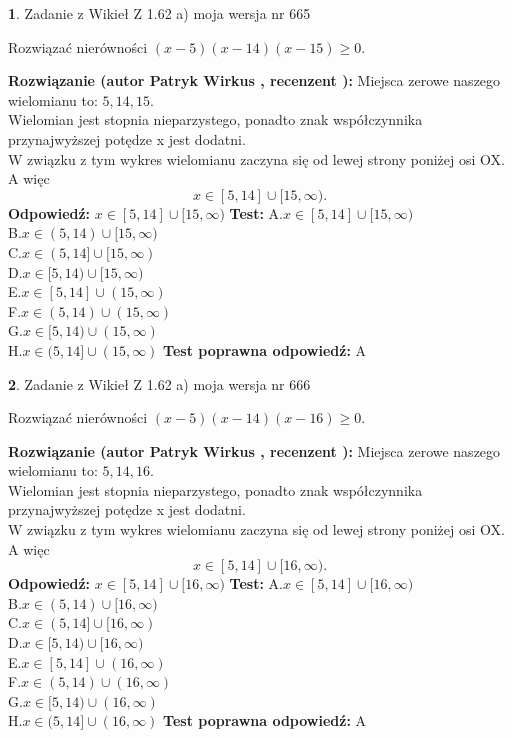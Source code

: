 \documentclass[12pt, a4paper]{article}
\theoremstyle{definition} %
\newtheorem{zad}{}
\newcommand{\zadStart}[1]{\begin{zad}#1\newline}
\newcommand{\zadStop}{\end{zad}}
\newcommand{\rozwStart}[2]{\noindent \textbf{Rozwiązanie (autor #1 , recenzent #2): }\newline}
\newcommand{\rozwStop}{\newline}
\newcommand{\odpStart}{\noindent \textbf{Odpowiedź:}\newline}
\newcommand{\odpStop}{\newline}
\newcommand{\testStart}{\noindent \textbf{Test:}\newline}
\newcommand{\testStop}{\newline}
\newcommand{\kluczStart}{\noindent \textbf{Test poprawna odpowiedź:}\newline}
\newcommand{\kluczStop}{\newline}
\begin{document}
\zadStart{Zadanie z Wikieł Z 1.62 a) moja wersja nr 665}

Rozwiązać nierówności $(x-5)(x-14)(x-15)\ge0$.
\zadStop
\rozwStart{Patryk Wirkus}{}
Miejsca zerowe naszego wielomianu to: $5, 14, 15$.\\
Wielomian jest stopnia nieparzystego, ponadto znak współczynnika przy\linebreak najwyższej potędze x jest dodatni.\\ W związku z tym wykres wielomianu zaczyna się od lewej strony poniżej osi OX. A więc $$x \in [5,14] \cup [15,\infty).$$
\rozwStop
\odpStart
$x \in [5,14] \cup [15,\infty)$
\odpStop
\testStart
A.$x \in [5,14] \cup [15,\infty)$\\
B.$x \in (5,14) \cup [15,\infty)$\\
C.$x \in (5,14] \cup [15,\infty)$\\
D.$x \in [5,14) \cup [15,\infty)$\\
E.$x \in [5,14] \cup (15,\infty)$\\
F.$x \in (5,14) \cup (15,\infty)$\\
G.$x \in [5,14) \cup (15,\infty)$\\
H.$x \in (5,14] \cup (15,\infty)$
\testStop
\kluczStart
A
\kluczStop



\zadStart{Zadanie z Wikieł Z 1.62 a) moja wersja nr 666}

Rozwiązać nierówności $(x-5)(x-14)(x-16)\ge0$.
\zadStop
\rozwStart{Patryk Wirkus}{}
Miejsca zerowe naszego wielomianu to: $5, 14, 16$.\\
Wielomian jest stopnia nieparzystego, ponadto znak współczynnika przy\linebreak najwyższej potędze x jest dodatni.\\ W związku z tym wykres wielomianu zaczyna się od lewej strony poniżej osi OX. A więc $$x \in [5,14] \cup [16,\infty).$$
\rozwStop
\odpStart
$x \in [5,14] \cup [16,\infty)$
\odpStop
\testStart
A.$x \in [5,14] \cup [16,\infty)$\\
B.$x \in (5,14) \cup [16,\infty)$\\
C.$x \in (5,14] \cup [16,\infty)$\\
D.$x \in [5,14) \cup [16,\infty)$\\
E.$x \in [5,14] \cup (16,\infty)$\\
F.$x \in (5,14) \cup (16,\infty)$\\
G.$x \in [5,14) \cup (16,\infty)$\\
H.$x \in (5,14] \cup (16,\infty)$
\testStop
\kluczStart
A
\kluczStop
\end{document}
